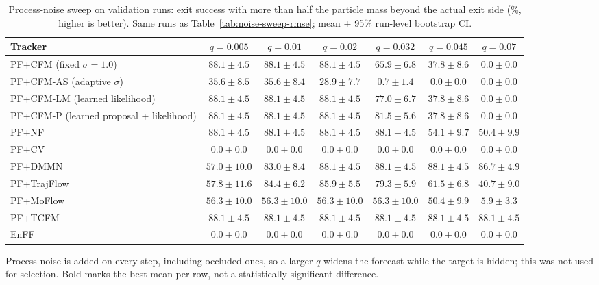 \begin{table}[ht]
\centering
\small
\caption{Process-noise sweep on validation runs: exit success with more than half the particle mass beyond the actual exit side (\%, higher is better). Same runs as Table~\ref{tab:noise-sweep-rmse}; mean $\pm$ 95\% run-level bootstrap CI.}
\label{tab:noise-sweep-exit}
\begin{adjustbox}{max width=\linewidth}
\begin{tabular}{lcccccc}
\toprule
Tracker & $q{=}0.005$ & $q{=}0.01$ & $q{=}0.02$ & $q{=}0.032$ & $q{=}0.045$ & $q{=}0.07$ \\
\midrule
PF+CFM (fixed $\sigma{=}1.0$) & $\mathbf{88.1\pm4.5}$ & $\mathbf{88.1\pm4.5}$ & $\mathbf{88.1\pm4.5}$ & $65.9\pm6.8$ & $37.8\pm8.6$ & $0.0\pm0.0$ \\
PF+CFM-AS (adaptive $\sigma$) & $\mathbf{35.6\pm8.5}$ & $\mathbf{35.6\pm8.4}$ & $28.9\pm7.7$ & $0.7\pm1.4$ & $0.0\pm0.0$ & $0.0\pm0.0$ \\
PF+CFM-LM (learned likelihood) & $\mathbf{88.1\pm4.5}$ & $\mathbf{88.1\pm4.5}$ & $\mathbf{88.1\pm4.5}$ & $77.0\pm6.7$ & $37.8\pm8.6$ & $0.0\pm0.0$ \\
PF+CFM-P (learned proposal + likelihood) & $\mathbf{88.1\pm4.5}$ & $\mathbf{88.1\pm4.5}$ & $\mathbf{88.1\pm4.5}$ & $81.5\pm5.6$ & $37.8\pm8.6$ & $0.0\pm0.0$ \\
PF+NF & $\mathbf{88.1\pm4.5}$ & $\mathbf{88.1\pm4.5}$ & $\mathbf{88.1\pm4.5}$ & $\mathbf{88.1\pm4.5}$ & $54.1\pm9.7$ & $50.4\pm9.9$ \\
PF+CV & $0.0\pm0.0$ & $0.0\pm0.0$ & $0.0\pm0.0$ & $0.0\pm0.0$ & $0.0\pm0.0$ & $0.0\pm0.0$ \\
PF+DMMN & $57.0\pm10.0$ & $83.0\pm8.4$ & $\mathbf{88.1\pm4.5}$ & $\mathbf{88.1\pm4.5}$ & $\mathbf{88.1\pm4.5}$ & $86.7\pm4.9$ \\
\midrule
PF+TrajFlow & $57.8\pm11.6$ & $84.4\pm6.2$ & $\mathbf{85.9\pm5.5}$ & $79.3\pm5.9$ & $61.5\pm6.8$ & $40.7\pm9.0$ \\
PF+MoFlow & $\mathbf{56.3\pm10.0}$ & $\mathbf{56.3\pm10.0}$ & $\mathbf{56.3\pm10.0}$ & $\mathbf{56.3\pm10.0}$ & $50.4\pm9.9$ & $5.9\pm3.3$ \\
PF+TCFM & $88.1\pm4.5$ & $88.1\pm4.5$ & $88.1\pm4.5$ & $88.1\pm4.5$ & $88.1\pm4.5$ & $88.1\pm4.5$ \\
EnFF & $0.0\pm0.0$ & $0.0\pm0.0$ & $0.0\pm0.0$ & $0.0\pm0.0$ & $0.0\pm0.0$ & $0.0\pm0.0$ \\
\bottomrule
\end{tabular}
\end{adjustbox}
\par\smallskip\parbox{0.95\linewidth}{\footnotesize Process noise is added on every step, including occluded ones, so a larger $q$ widens the forecast while the target is hidden; this was not used for selection. Bold marks the best mean per row, not a statistically significant difference.}
\end{table}


